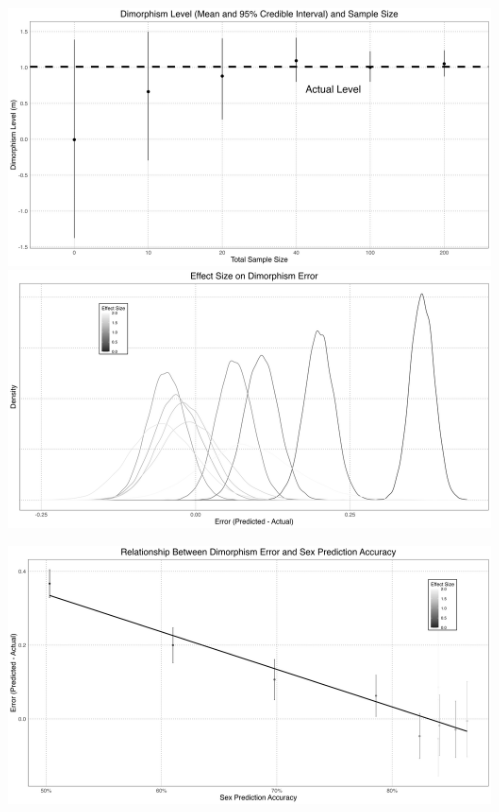 \documentclass[
  landscape,
  a0paper,
  20pt,
  margin=0mm,
  innermargin=10mm,
  blockverticalspace=0mm,
  colspace=5mm,
]{tikzposter} %
\begin{document}
\begin{columns}
{\begin{itemize}
  \end{itemize}
    \begin{tikzfigure}
      \includegraphics[width = 0.4\colwidth]{images/alligatorSampleSize-poster.png}
      \includegraphics[width = 0.4\colwidth]{images/alligatorEffectSize-poster.png}

      \includegraphics[width = 0.45\colwidth]{images/alligatorSexPredictionAccuracyDimorphismError-poster.png}
    \end{tikzfigure}
}


\end{columns}
\end{document}

